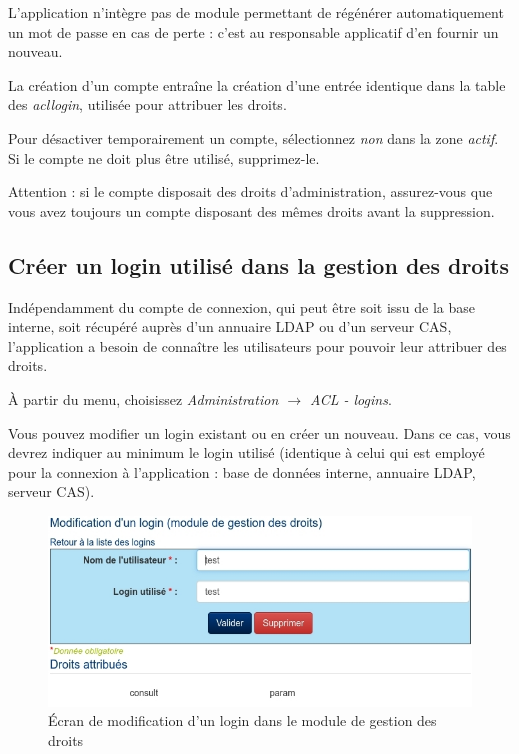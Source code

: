 L'application n'intègre pas de module permettant de régénérer automatiquement un mot de passe en cas de perte : c'est au responsable applicatif d'en fournir un nouveau.

La création d'un compte entraîne la création d'une entrée identique dans la table des \textit{acllogin}, utilisée pour attribuer les droits.

Pour désactiver temporairement un compte, sélectionnez \textit{non} dans la zone \textit{actif}. Si le compte ne doit plus être utilisé, supprimez-le.

Attention : si le compte disposait des droits d'administration, assurez-vous que vous avez toujours un compte disposant des mêmes droits avant la suppression.

\subsection{Créer un login utilisé dans la gestion des droits}

Indépendamment du compte de connexion, qui peut être soit issu de la base interne, soit récupéré auprès d'un annuaire LDAP ou d'un serveur CAS, l'application a besoin de connaître les utilisateurs pour pouvoir leur attribuer des droits.

À partir du menu, choisissez \textit{Administration $\rightarrow$ ACL - logins}.

Vous pouvez modifier un login existant ou en créer un nouveau. Dans ce cas, vous devrez indiquer au minimum le login utilisé (identique à celui qui est employé pour la connexion à l'application : base de données interne, annuaire LDAP, serveur CAS).

\begin{figure}[H]
\includegraphics[width=\linewidth]{images/acl_login}
\caption{Écran de modification d'un login dans le module de gestion des droits}
\end{figure}


